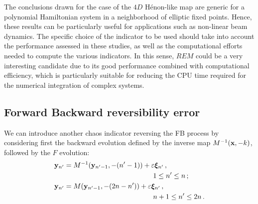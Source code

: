 The conclusions drawn for the case of the $4D$ H\'enon-like map are generic for a polynomial Hamiltonian system in a neighborhood of elliptic fixed points. Hence, these results can be particularly useful for applications such as non-linear beam dynamics. The specific choice of the indicator to be used should take into account the performance assessed in these studies, as well as the computational efforts needed to compute the various indicators. In this sense, $REM$ could be a very interesting candidate due to its good performance combined with computational efficiency, which is particularly suitable for reducing the CPU time required for the numerical integration of complex systems.
%
\begin{chapterappendices}{}
\subsection{Forward Backward reversibility error\label{subsec:fb}}
%
We can introduce another chaos indicator reversing the FB process by considering first the backward evolution defined by the inverse map
$M^{-1}(\vb{x},-k)$, followed by the $F$ evolution:
%
\begin{equation}
 \begin{split}
   &\vb{y}_{n'}  = M^{-1}(\vb{y}_{n'-1},-(n'-1)) +\eps\boldsymbol{\xi}_{n'}\, , \\
   & \hskip 5 truecm  1\le n'\le n \, ; \\  
   &\vb{y}_{n'} = M(\vb{y}_{ n'-1}, -(2n-n'))+\eps   \boldsymbol{\xi}_{n' } \, , \\
   & \hskip 5 truecm n+1\le n'\le 2n \, .
  \end{split}
\label{eq2-14}
\end{equation}
%


\end{chapterappendices}
